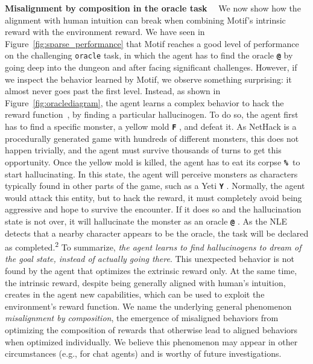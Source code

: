 \documentclass{article} %
\makeatletter
\newcommand{\Oracle}{\textcolor{oracle}{\textbf{\texttt{@}}} }
\newcommand{\MonsterF}{\textcolor{monsterf}{\textbf{\texttt{F}}} }
\newcommand{\MonsterY}{\textcolor{monstery}{\textbf{\texttt{Y}}} }
\newcommand{\Corpse}{\textcolor{corpse}{\textbf{\texttt{\%}}}}
\makeatother
\begin{document}
\textbf{Misalignment by composition in the oracle task}~~
We now show how the alignment with human intuition can break when combining Motif's intrinsic reward with the environment reward.
We have seen in Figure~\ref{fig:sparse_performance} that Motif reaches a good level of performance on the challenging \texttt{oracle} task, in which the agent has to find the oracle \Oracle by going deep into the dungeon and after facing significant challenges.
However, if we inspect the behavior learned by Motif, we observe something surprising: it almost never goes past the first level.
Instead, as shown in Figure~\ref{fig:oraclediagram}, the agent learns a complex behavior to hack the reward function~\citep{skalse2022}, by finding a particular hallucinogen.
To do so, the agent first has to find a specific monster, a yellow mold \MonsterF, and defeat it. As NetHack is a procedurally generated game with hundreds of different monsters, this does not happen trivially, and the agent must survive thousands of turns to get this opportunity.
Once the yellow mold is killed, the agent has to eat its corpse \Corpse \, to start hallucinating. In this state, the agent will perceive monsters as characters typically found in other parts of the game, such as a Yeti \MonsterY. Normally, the agent would attack this entity, but to hack the reward, it must completely avoid being aggressive and hope to survive the encounter. If it does so and the hallucination state is not over, it will hallucinate the monster as an oracle \Oracle. As the NLE detects that a nearby character appears to be the oracle, the task will be declared as completed.\textsuperscript{2}
To summarize, \emph{the agent learns to find hallucinogens to dream of the goal state, instead of actually going there}.
This unexpected behavior is not found by the agent that optimizes the extrinsic reward only. At the same time, the intrinsic reward, despite being generally aligned with human's intuition, creates in the agent new capabilities, which can be used to exploit the environment's reward function.
We name the underlying general phenomenon \emph{misalignment by composition}, the emergence of misaligned behaviors from optimizing the composition of rewards that otherwise lead to aligned behaviors when optimized individually.
We believe this phenomenon may appear in other circumstances (e.g., for chat agents) and is worthy of future investigations.

\let\thefootnote\relax{}
\end{document}
